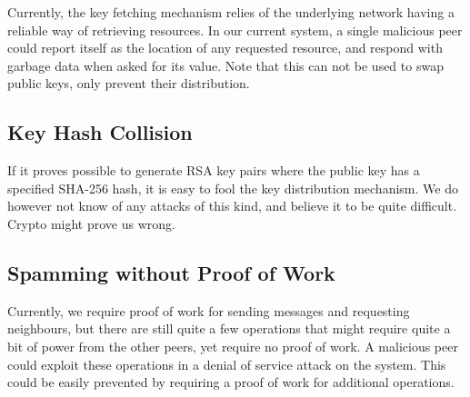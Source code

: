 Currently, the key fetching mechanism relies of the underlying network having a reliable way of retrieving resources. In our current system, a single malicious peer could report itself as the location of any requested resource, and respond with garbage data when asked for its value. Note that this can not be used to swap public keys, only prevent their distribution.

\subsection{Key Hash Collision}

If it proves possible to generate RSA key pairs where the public key has a specified SHA-256 hash, it is easy to fool the key distribution mechanism. We do however not know of any attacks of this kind, and believe it to be quite difficult. Crypto might prove us wrong.

\subsection{Spamming without Proof of Work}

Currently, we require proof of work for sending messages and requesting neighbours, but there are still quite a few operations that might require quite a bit of power from the other peers, yet require no proof of work. A malicious peer could exploit these operations in a denial of service attack on the system. This could be easily prevented by requiring a proof of work for additional operations.
